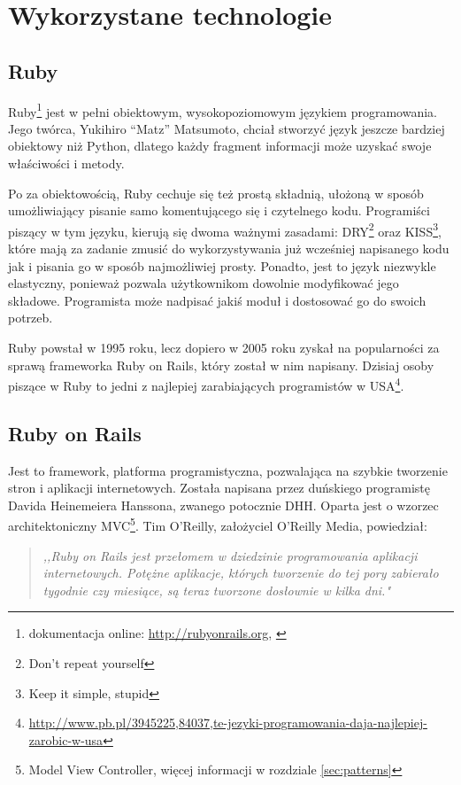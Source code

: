 \section{Wykorzystane technologie}
  \subsection{Ruby}
  \label{sec:Ruby}
  Ruby\footnote{dokumentacja online: \url{http://rubyonrails.org}, \cite{ruby_lang}} jest w pełni obiektowym, wysokopoziomowym językiem programowania. Jego twórca, Yukihiro “Matz” Matsumoto, chciał stworzyć język jeszcze bardziej obiektowy niż Python, dlatego każdy fragment informacji może uzyskać swoje właściwości i metody.

  Po za obiektowością, Ruby cechuje się też prostą składnią, ułożoną w sposób umożliwiający pisanie samo komentującego się i czytelnego kodu. Programiści piszący w tym języku, kierują się dwoma ważnymi zasadami: DRY\footnote{Don't repeat yourself\cite{programming_ruby}} oraz KISS\footnote{Keep it simple, stupid\cite{programming_ruby}}, które mają za zadanie zmusić do wykorzystywania już wcześniej napisanego kodu jak i pisania go w sposób najmożliwiej prosty. Ponadto, jest to język niezwykle elastyczny, ponieważ pozwala użytkownikom dowolnie modyfikować jego składowe. Programista może nadpisać jakiś moduł i dostosować go do swoich potrzeb.

  Ruby powstał w 1995 roku, lecz dopiero w 2005 roku zyskał na popularności za sprawą frameworka Ruby on Rails, który został w nim napisany. Dzisiaj osoby piszące w Ruby to jedni z najlepiej zarabiających programistów w USA\footnote{\url{http://www.pb.pl/3945225,84037,te-jezyki-programowania-daja-najlepiej-zarobic-w-usa}}.

  \subsection{Ruby on Rails}
  \label{sec:Rails}
  Jest to framework, platforma programistyczna, pozwalająca na szybkie tworzenie stron i aplikacji internetowych. Została napisana przez duńskiego programistę Davida Heinemeiera Hanssona, zwanego potocznie DHH. Oparta jest o wzorzec architektoniczny MVC\footnote{Model View Controller, więcej informacji w rozdziale \ref{sec:patterns}}.
  \clearpage
  Tim O'Reilly, założyciel O'Reilly Media, powiedział:
  \begin{quote}
    \emph{,,Ruby on Rails jest przełomem w dziedzinie programowania aplikacji internetowych.
    Potężne aplikacje, których tworzenie do tej pory zabierało tygodnie czy miesiące, są teraz tworzone dosłownie w kilka dni."}
  \end{quote}

